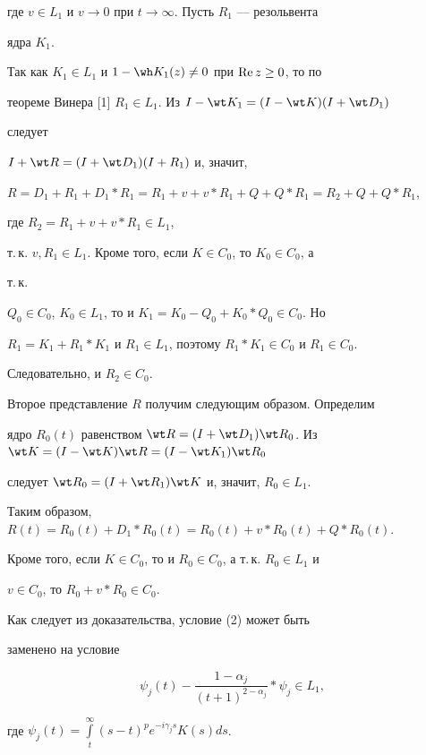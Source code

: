 \begin{pf}
где $v\in L_1$ и $v\to0$ при $t\to\infty$. Пусть $R_1$ --- резольвента 


ядра $K_1$. 


Так как $K_1\in L_1$ и $1-\wh K_1(z)\ne0$ при $\operatorname{Re} z\ge0$, то по 


теореме Винера [1]\; $R_1\in L_1$. Из $I-\wt K_1=(I-\wt K)(I+\wt D_1)$ 


следует 


$I+\wt R=(I+\wt D_1)(I+R_1)$ и, значит,


$R=D_1+R_1+D_1*R_1=R_1+v+v*R_1+Q+Q*R_1=R_2+Q+Q*R_1$, 


где $R_2=R_1+v+v*R_1\in L_1$, 


т.\,к. $v,R_1\in L_1$. Кроме того, если $K\in C_0$, то $K_0\in C_0$, а 


т.\,к. 


$Q_0\in C_0$, $K_0\in L_1$, то и $K_1=K_0-Q_0+K_0*Q_0\in C_0$. Но 


$R_1=K_1+R_1*K_1$ и $R_1\in L_1$, поэтому $R_1*K_1\in C_0$ и $R_1\in 


C_0$. 


Следовательно, и $R_2\in C_0$. 


 


Второе представление $R$ получим следующим образом. Определим 


ядро $R_0(t)$ равенством $\wt R=(I+\wt D_1)\wt R_0$. Из $\wt K=(I-\wt 


K)\wt R=(I-\wt K_1)\wt R_0$ 


следует $\wt R_0=(I+\wt R_1)\wt K$ и, значит, $R_0\in L_1$. 


Таким образом, $R(t)=R_0(t)+D_1*R_0(t)=R_0(t)+v*R_0(t)+Q*R_0(t)$. 


Кроме того, если $K\in C_0$, то и $R_0\in C_0$, а т.\,к. $R_0\in L_1$ и 


$v\in C_0$, то $R_0+v*R_0\in C_0$. 


\end{pf} 


 


\begin{notenonum} 


Как следует из доказательства, условие (2) может быть 


заменено на условие 


$$ 


\psi_j(t)-\frac{1-\alpha_j}{(t+1)^{2-\alpha_j}}*\psi_j\in L_1,


$$ 


где $\psi_j(t)=\int\limits^\infty_t(s-t)^p e^{-i\gamma_j s}K(s)ds$. 


\end{notenonum} 


